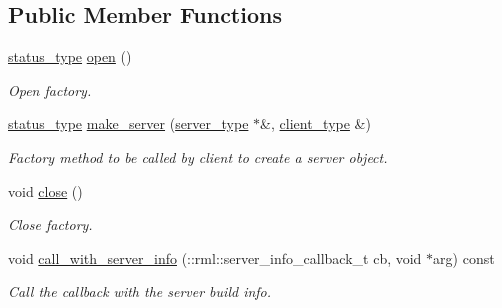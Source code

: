 \subsection*{Public Member Functions}
\begin{DoxyCompactItemize}
\item 
\hyperlink{classrml_1_1factory_a4c1de6c79581a01b37d4ff16340e44c9}{status\+\_\+type} \hyperlink{classtbb_1_1internal_1_1rml_1_1tbb__factory_a86bfebfa4755f0d0f07283a74c1581fd}{open} ()
\begin{DoxyCompactList}\small\item\em Open factory. \end{DoxyCompactList}\item 
\hyperlink{classrml_1_1factory_a4c1de6c79581a01b37d4ff16340e44c9}{status\+\_\+type} \hyperlink{classtbb_1_1internal_1_1rml_1_1tbb__factory_a81f736b9875ed1dc7dccd7404e08a057}{make\+\_\+server} (\hyperlink{classtbb_1_1internal_1_1rml_1_1tbb__server}{server\+\_\+type} $\ast$\&, \hyperlink{classtbb_1_1internal_1_1rml_1_1tbb__client}{client\+\_\+type} \&)
\begin{DoxyCompactList}\small\item\em Factory method to be called by client to create a server object. \end{DoxyCompactList}\item 
\hypertarget{classtbb_1_1internal_1_1rml_1_1tbb__factory_a324b0329d0356ce02c1f8d7fce8ed7af}{}void \hyperlink{classtbb_1_1internal_1_1rml_1_1tbb__factory_a324b0329d0356ce02c1f8d7fce8ed7af}{close} ()\label{classtbb_1_1internal_1_1rml_1_1tbb__factory_a324b0329d0356ce02c1f8d7fce8ed7af}

\begin{DoxyCompactList}\small\item\em Close factory. \end{DoxyCompactList}\item 
\hypertarget{classtbb_1_1internal_1_1rml_1_1tbb__factory_a7377ea182a09d60d4cf6c5d80befd88a}{}void \hyperlink{classtbb_1_1internal_1_1rml_1_1tbb__factory_a7377ea182a09d60d4cf6c5d80befd88a}{call\+\_\+with\+\_\+server\+\_\+info} (\+::rml\+::server\+\_\+info\+\_\+callback\+\_\+t cb, void $\ast$arg) const \label{classtbb_1_1internal_1_1rml_1_1tbb__factory_a7377ea182a09d60d4cf6c5d80befd88a}

\begin{DoxyCompactList}\small\item\em Call the callback with the server build info. \end{DoxyCompactList}\end{DoxyCompactItemize}
